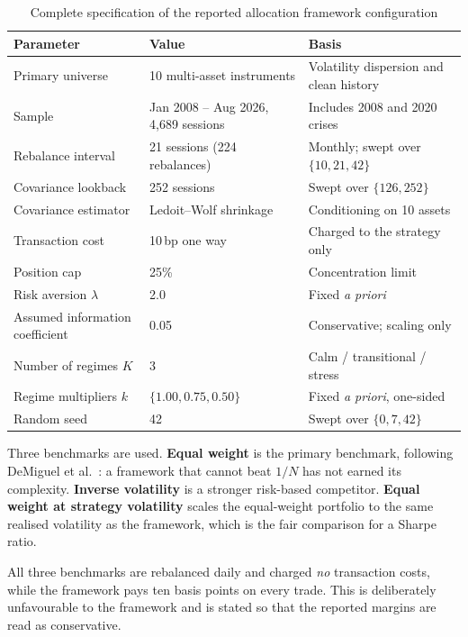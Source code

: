 \begin{table}[!htb]
\centering
\caption[Specification of the allocation framework]{Complete specification of the reported
allocation framework configuration}
\label{tab:alloc-spec}
\tabfont
\begin{tabular}{@{}L{5.2cm}L{4.0cm}L{4.6cm}@{}}
\toprule
\textbf{Parameter} & \textbf{Value} & \textbf{Basis} \\
\midrule
Primary universe & 10 multi-asset instruments & Volatility dispersion and clean history \\
Sample & Jan 2008 -- Aug 2026, 4,689 sessions & Includes 2008 and 2020 crises \\
Rebalance interval & 21 sessions (224 rebalances) & Monthly; swept over $\{10, 21, 42\}$ \\
Covariance lookback & 252 sessions & Swept over $\{126, 252\}$ \\
Covariance estimator & Ledoit--Wolf shrinkage & Conditioning on 10 assets \\
Transaction cost & 10\,bp one way & Charged to the strategy only \\
Position cap & 25\% & Concentration limit \\
Risk aversion $\lambda$ & 2.0 & Fixed \emph{a priori} \\
Assumed information coefficient & 0.05 & Conservative; scaling only \\
Number of regimes $K$ & 3 & Calm / transitional / stress \\
Regime multipliers $k$ & $\{1.00, 0.75, 0.50\}$ & Fixed \emph{a priori}, one-sided \\
Random seed & 42 & Swept over $\{0, 7, 42\}$ \\
\bottomrule
\end{tabular}
\end{table}

Three benchmarks are used. \textbf{Equal weight} is the primary benchmark, following DeMiguel et
al.~\cite{demiguel2009}: a framework that cannot beat $1/N$ has not earned its complexity.
\textbf{Inverse volatility} is a stronger risk-based competitor. \textbf{Equal weight at strategy
volatility} scales the equal-weight portfolio to the same realised volatility as the framework,
which is the fair comparison for a Sharpe ratio.

All three benchmarks are rebalanced daily and charged \emph{no} transaction costs, while the
framework pays ten basis points on every trade. This is deliberately unfavourable to the framework
and is stated so that the reported margins are read as conservative.

